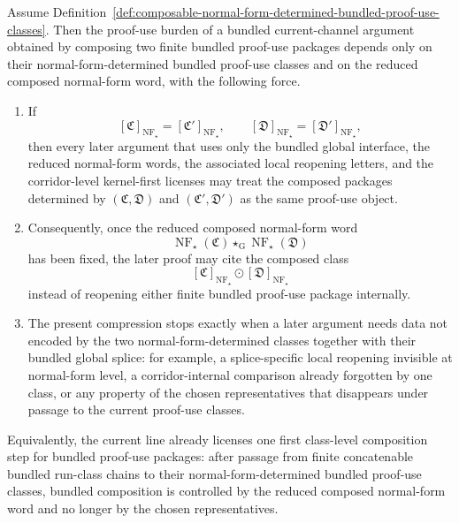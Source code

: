 \begin{proposition}
\label{prop:first-proof-use-class-composition-principle}
Assume Definition~\ref{def:composable-normal-form-determined-bundled-proof-use-classes}. Then the proof-use burden of a bundled current-channel argument obtained by composing two finite bundled proof-use packages depends only on their normal-form-determined bundled proof-use classes and on the reduced composed normal-form word, with the following force.
\begin{enumerate}[leftmargin=2em,label=(\roman*)]
\item If
\[
[\mathfrak C]_{\operatorname{NF}_{\star}}=[\mathfrak C']_{\operatorname{NF}_{\star}},
\qquad
[\mathfrak D]_{\operatorname{NF}_{\star}}=[\mathfrak D']_{\operatorname{NF}_{\star}},
\]
then every later argument that uses only the bundled global interface, the reduced normal-form words, the associated local reopening letters, and the corridor-level kernel-first licenses may treat the composed packages determined by \((\mathfrak C,\mathfrak D)\) and \((\mathfrak C',\mathfrak D')\) as the same proof-use object.
\item Consequently, once the reduced composed normal-form word
\[
\operatorname{NF}_{\star}(\mathfrak C)\star_{\mathrm G}\operatorname{NF}_{\star}(\mathfrak D)
\]
has been fixed, the later proof may cite the composed class
\[
[\mathfrak C]_{\operatorname{NF}_{\star}}\odot[\mathfrak D]_{\operatorname{NF}_{\star}}
\]
instead of reopening either finite bundled proof-use package internally.
\item The present compression stops exactly when a later argument needs data not encoded by the two normal-form-determined classes together with their bundled global splice: for example, a splice-specific local reopening invisible at normal-form level, a corridor-internal comparison already forgotten by one class, or any property of the chosen representatives that disappears under passage to the current proof-use classes.
\end{enumerate}
Equivalently, the current line already licenses one first class-level composition step for bundled proof-use packages: after passage from finite concatenable bundled run-class chains to their normal-form-determined bundled proof-use classes, bundled composition is controlled by the reduced composed normal-form word and no longer by the chosen representatives.
\end{proposition}

